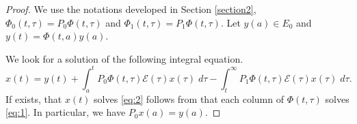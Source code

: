 \documentclass[a4paper,11pt]{article}
\newcommand{\E}{\mathcal{E}}
\theoremstyle{remark}
\begin{document}
\begin{proof}
We use the notations developed in Section \ref{section2}, $\Phi_0(t,\tau) = P_0\Phi(t,\tau)$ and $\Phi_1(t,\tau) = P_1\Phi(t,\tau)$. Let $y(a) \in E_0$ and $y(t) = \Phi(t,a)y(a)$.

 
We look for a solution of the following integral equation.
 \begin{equation*} \label{eq:integral}
 x(t) = y(t) + \int_a^t P_0\Phi(t,\tau)\E(\tau)x(\tau) \;d\tau  - \int_t^\infty P_1\Phi(t,\tau)\E(\tau)x(\tau) \; d\tau.
 \end{equation*}
 If exists, that $x(t)$ solves \eqref{eq:2} follows from that each column of $\Phi(t,\tau)$ solves \eqref{eq:1}. In particular, we have $P_0x(a) = y(a)$.
 

\end{proof}
\end{document}
